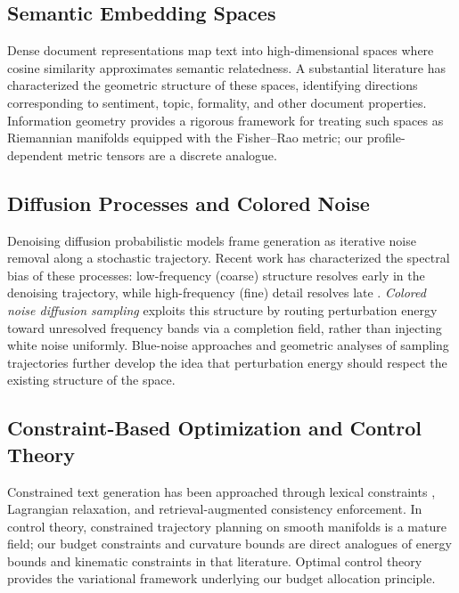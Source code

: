 \documentclass[12pt, a4paper]{article}
\theoremstyle{plain}
\theoremstyle{definition}
\theoremstyle{remark}
\begin{document}
\subsection{Semantic Embedding Spaces}

Dense document representations \cite{mikolov2013efficient, devlin2019bert,
reimers2019sentencebert} map text into high-dimensional spaces where cosine
similarity approximates semantic relatedness.  A substantial literature
\cite{ethayarajh2019contextual, rahaman2019spectralbias} has characterized the
geometric structure of these spaces, identifying directions corresponding to
sentiment, topic, formality, and other document properties.  Information
geometry \cite{amari2016information} provides a rigorous framework for treating
such spaces as Riemannian manifolds equipped with the Fisher--Rao metric;
our profile-dependent metric tensors are a discrete analogue.

\subsection{Diffusion Processes and Colored Noise}

Denoising diffusion probabilistic models \cite{ho2020ddpm} frame generation as
iterative noise removal along a stochastic trajectory.  Recent work has
characterized the spectral bias of these processes: low-frequency (coarse)
structure resolves early in the denoising trajectory, while high-frequency
(fine) detail resolves late \cite{rahaman2019spectralbias,
falck2025fourierspace}.  \emph{Colored noise diffusion sampling}
\cite{davidson2026colorednoisediffusionsampling} exploits this structure by
routing perturbation energy toward unresolved frequency bands via a completion
field, rather than injecting white noise uniformly.  Blue-noise approaches
\cite{huang2024bluenoise} and geometric analyses of sampling trajectories
\cite{wang2025rotationaltrajectories} further develop the idea that
perturbation energy should respect the existing structure of the space.

\subsection{Constraint-Based Optimization and Control Theory}

Constrained text generation has been approached through lexical constraints
\cite{hokamp2017lexically}, Lagrangian relaxation, and retrieval-augmented
consistency enforcement.  In control theory, constrained trajectory planning
on smooth manifolds \cite{lee2013smooth, docarmo1992riemannian} is a mature
field; our budget constraints and curvature bounds are direct analogues of
energy bounds and kinematic constraints in that literature.  Optimal control
theory \cite{liberzon2012optimal, bertsekas1995dynamic} provides the
variational framework underlying our budget allocation principle.
\end{document}
